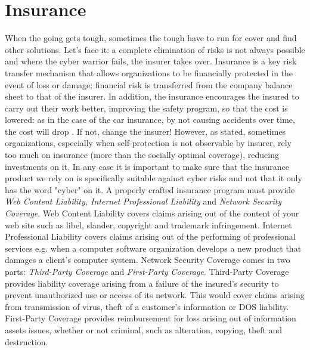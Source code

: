 \section{Insurance}
When the going gets tough, sometimes the tough have to run for cover and find other solutions. Let's face it: a complete elimination of risks is not always possible and where the cyber warrior fails, the insurer takes over. Insurance is a key risk transfer mechanism that allows organizations to be financially protected in the event of loss or damage: financial risk is transferred from the company balance sheet to that of the insurer. In addition, the insurance encourages the insured to carry out their work better, improving the safety program, so that the cost is lowered: as in the case of the car insurance, by not causing accidents over time, the cost will drop \cite{Siegel2002}. If not, change the insurer! However, as \cite{Ogut2011} stated, sometimes organizations, especially when self-protection is not observable by insurer, rely too much on insurance (more than the socially optimal coverage), reducing investments on it. In any case it is important to make sure that the insurance product we rely on is specifically suitable against cyber risks and not that it only has the word "cyber" on it. A properly crafted insurance program must provide \textit{Web Content Liability, Internet Professional Liability} and \textit{Network Security Coverage}. Web Content Liability covers claims arising out of the content of your web site such as libel, slander, copyright and trademark infringement. Internet Professional Liability covers claims arising out of the performing of professional services e.g. when a computer software organization develops a new product that damages a client’s computer system. Network Security Coverage comes in two parts: \textit{Third-Party Coverage} and \textit{First-Party Coverage}. Third-Party Coverage provides liability coverage arising from a failure of the insured’s security to prevent unauthorized use or access of its network. This would cover claims arising from transmission of virus, theft of a customer’s information or DOS liability. First-Party Coverage provides reimbursement for loss arising out of information assets issues, whether or not criminal, such as alteration, copying, theft and destruction.

